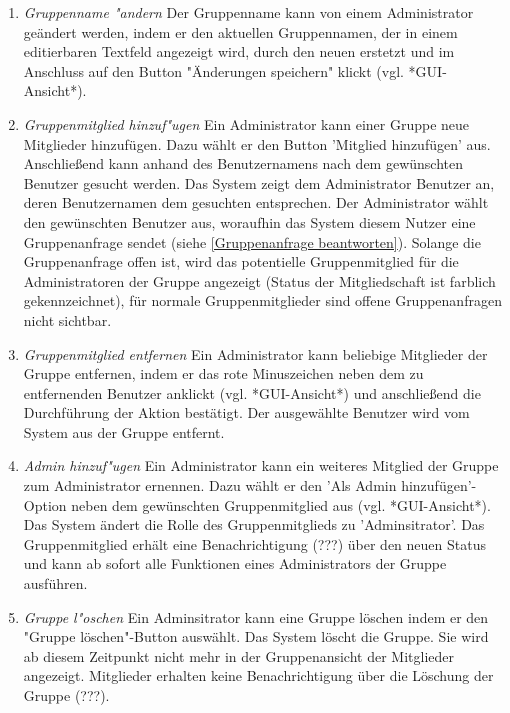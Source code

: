 \documentclass[parskip=full]{scrartcl}
\def\threedigits#1{%
  \ifnum#1<100 0\fi
  \ifnum#1<10 0\fi
  \number#1}
\begin{document}
\begin{enumerate}[label={\textbf{/F\protect\threedigits{\theenumi}0/}}, leftmargin=*, resume]

	\item \textit{Gruppenname "andern}
	Der Gruppenname kann von einem Administrator geändert werden, indem er den aktuellen Gruppennamen, der in einem editierbaren Textfeld angezeigt wird, durch den neuen erstetzt und im Anschluss auf den Button "Änderungen speichern" klickt (vgl. *GUI-Ansicht*).
	
	\item \textit{Gruppenmitglied hinzuf"ugen} \label{Mitglieder hinzufügen}
	Ein Administrator kann einer Gruppe neue Mitglieder hinzufügen. Dazu wählt er den Button 'Mitglied hinzufügen' aus. Anschließend kann anhand des \gls{Benutzername}ns nach dem gewünschten Benutzer gesucht werden. Das System zeigt dem Administrator Benutzer an, deren Benutzernamen dem gesuchten entsprechen. Der Administrator wählt den gewünschten Benutzer aus, woraufhin das System diesem Nutzer eine Gruppenanfrage sendet (siehe \ref{Gruppenanfrage beantworten}). Solange die Gruppenanfrage offen ist, wird das potentielle Gruppenmitglied für die Administratoren der Gruppe angezeigt (Status der Mitgliedschaft ist farblich gekennzeichnet), für normale Gruppenmitglieder sind offene Gruppenanfragen nicht sichtbar.
	
	\item \textit{Gruppenmitglied entfernen}
	Ein Administrator kann beliebige Mitglieder der Gruppe entfernen, indem er das rote Minuszeichen neben dem zu entfernenden Benutzer anklickt (vgl. *GUI-Ansicht*) und anschließend die Durchführung der Aktion bestätigt. Der ausgewählte Benutzer wird vom System aus der Gruppe entfernt.
	
	\item \textit{Admin hinzuf"ugen} \label{Admin hinzufügen}
	Ein Administrator kann ein weiteres Mitglied der Gruppe zum Administrator ernennen. Dazu wählt er den 'Als Admin hinzufügen'-Option neben dem gewünschten Gruppenmitglied aus (vgl. *GUI-Ansicht*). Das System ändert die Rolle des Gruppenmitglieds zu 'Adminsitrator'. Das Gruppenmitglied erhält eine Benachrichtigung (???) über den neuen Status und kann ab sofort alle Funktionen eines Administrators der Gruppe ausführen.
	
	\item \textit{Gruppe l"oschen}
	Ein Adminsitrator kann eine Gruppe löschen indem er den "Gruppe löschen"-Button auswählt. Das System löscht die Gruppe. Sie wird ab diesem Zeitpunkt nicht mehr in der Gruppenansicht der Mitglieder angezeigt. Mitglieder erhalten keine Benachrichtigung über die Löschung der Gruppe (???).
	
\end{enumerate}
	
\end{document}

